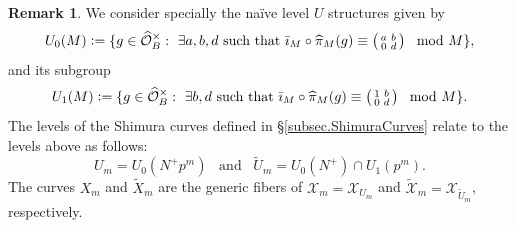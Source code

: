 \documentclass[a4paper]{amsart}
\numberwithin{equation}{section}
\theoremstyle{definition}
\newtheorem{remark}[theorem]{Remark}
\newcommand{\defeq}{\vcentcolon=}
\begin{document}
\begin{remark}
We consider specially the naïve level $U$ structures given by
\[U_0(M)\defeq\{g\in\widehat{\mathcal{O}}_B^\times:\ \exists a,b,d\text{ such that } \bar{\imath}_M\circ\widehat{\pi}_M(g)\equiv\left(\begin{smallmatrix}a & b \\ 0 & d\end{smallmatrix}\right)\mod M\},\] and its subgroup \[U_1(M)\defeq\{g\in\widehat{\mathcal{O}}_B^\times:\ \exists b,d\text{ such that } \bar{\imath}_M\circ\widehat{\pi}_M(g)\equiv\left(\begin{smallmatrix}1 & b \\ 0 & d\end{smallmatrix}\right)\mod M\}.\]
The levels of the Shimura curves defined in \S\ref{subsec.ShimuraCurves} relate to the levels above as follows: \[U_m= U_0(N^{+}p^m)\hspace{10pt}\text{and}\hspace{10pt} \widetilde{U}_m= U_0(N^{+})\cap U_1(p^m).\] The curves $X_m$ and $\widetilde{X}_m$ are the generic fibers of $\mathcal{X}_m=\mathcal{X}_{U_m}$ and $\widetilde{\mathcal{X}}_m=\mathcal{X}_{\widetilde{U}_m}$, respectively.
\end{remark}
 
\end{document}
